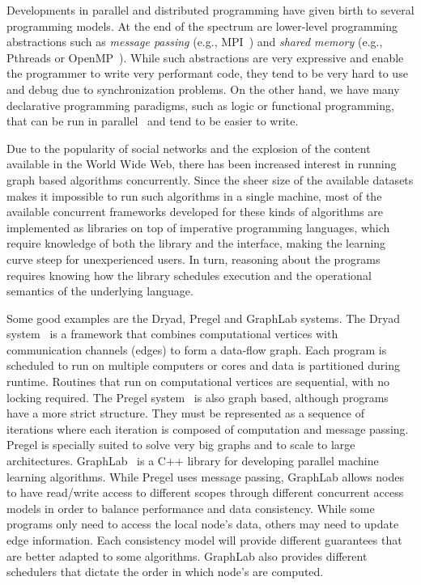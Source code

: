 
Developments in parallel and distributed programming have given birth to several programming models.
At the end of the spectrum are lower-level programming abstractions such as
\emph{message passing} (e.g., MPI~\cite{gabriel04-open-mpi}) and \emph{shared memory}
(e.g., Pthreads or OpenMP~\cite{Chapman-2007-UOP-1370966}).
While such abstractions are very expressive and enable the programmer to write very performant code,
they tend to be very hard to use and debug due to synchronization problems.
On the other hand, we have many declarative programming paradigms, such as logic or functional programming,
that can be run in parallel~\cite{Blelloch:1996:PPA:227234.227246,Gupta:2001:PEP:504083.504085} and tend to be easier to write.

Due to the popularity of social networks and the explosion of the content available in the World Wide Web, there has been
increased interest in running graph based algorithms concurrently. Since the sheer size of
the available datasets makes it impossible to run such algorithms in a single machine, most of the available concurrent frameworks developed for these kinds of algorithms are implemented as libraries on top
of imperative programming languages, which require knowledge of both the library and the interface, making
the learning curve steep for unexperienced users. In turn, reasoning about the programs requires knowing how
the library schedules execution and the operational semantics of the underlying language.

Some good examples are the Dryad, Pregel and GraphLab systems.
The Dryad system~\cite{Isard:2007:DDD:1272996.1273005} is a framework that combines computational vertices
with communication channels (edges) to form a data-flow graph. Each program is scheduled to
run on multiple computers or cores and data is partitioned during runtime. Routines that run on computational vertices
are sequential, with no locking required.
The Pregel system~\cite{Malewicz:2010:PSL:1807167.1807184} is also graph based, although programs have a more strict
structure. They must be represented as a sequence of iterations where each iteration is composed of computation and message passing.
Pregel is specially suited to solve very big graphs
and to scale to large architectures. GraphLab~\cite{GraphLab2010} is a C++ library for developing parallel machine learning algorithms. While
Pregel uses message passing, GraphLab allows nodes to have read/write access to different scopes through different concurrent access models in order to balance performance and data consistency. While some programs only need to access the local node's data, others may need to update edge information. Each consistency model will provide different guarantees that are better adapted to some algorithms. GraphLab also provides different schedulers that dictate the order in which node's are computed.

